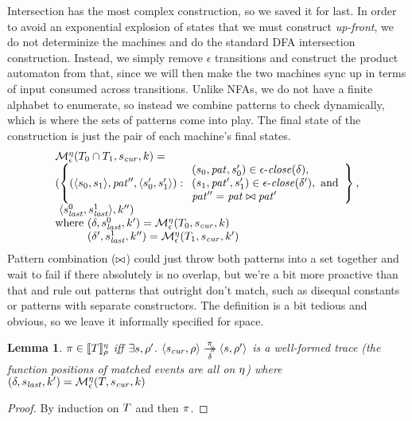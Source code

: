 \documentclass[preprint,onecolumn,9pt]{sigplanconf} %
\newtheorem{lemma}{Lemma}
\begin{document}
Intersection has the most complex construction, so we saved it for last.
%
In order to avoid an exponential explosion of states that we must construct \emph{up-front}, we do not determinize the machines and do the standard DFA intersection construction.
%
Instead, we simply remove $\epsilon$ transitions and construct the product automaton from that, since we will then make the two machines sync up in terms of input consumed across transitions.
%
Unlike NFAs, we do not have a finite alphabet to enumerate, so instead we combine patterns to check dynamically, which is where the sets of patterns come into play.
%
The final state of the construction is just the pair of each machine's final states.
\begin{align*}
  \begin{array}{l}
  \epshelp^\mtimeline(\stAnd{\mtcon_0}{\mtcon_1}, \pmsmqcur, k) = \\
  (\left\{(\pmsmpair{\pmsmqq_0}{\pmsmqq_1}, \mpat'', \pmsmpair{\pmsmqq'_0}{\pmsmqq'_1}) :
          \begin{array}{l}
                (\pmsmqq_0, \mpat, \pmsmqq'_0) \in \epsclose(\delta),\\
                (\pmsmqq_1, \mpat', \pmsmqq'_1) \in \epsclose(\delta'), \text{ and}\\
                \mpat'' = \combinepat{\mpat}{\mpat'}
           \end{array} \right\},\\
  \ \pmsmpair{\pmsmqlast^0}{\pmsmqlast^1}, k'') \\
  \text{where } (\delta, \pmsmqlast^0, k') = \epshelp^\mtimeline(\mtcon_0, \pmsmqcur, k) \\
  \phantom{\text{where }} (\delta', \pmsmqlast^1, k'') = \epshelp^\mtimeline(\mtcon_1, \pmsmqcur, k')
\end{array}
\end{align*}
%
Pattern combination ($\bowtie$) could just throw both patterns into a set together and wait to fail if there absolutely is no overlap, but we're a bit more proactive than that and rule out patterns that outright don't match, such as disequal constants or patterns with separate constructors.
%
The definition is a bit tedious and obvious, so we leave it informally specified for space.

\begin{lemma}
  $\pi \in [\![ T ]\!]^{\eta}_{\rho}$ iff $\exists s, \rho'$. $\langle s_\mathit{cur}, \rho \rangle \overset{\pi}{\underset{\delta}{\to\!\!\!\!\!\to}} \langle s, \rho' \rangle$ is a well-formed trace (the function positions of matched events are all on $\eta$) where $(\delta, s_\mathit{last}, k') = {\mathcal M}_\epsilon^\eta(T, s_\mathit{cur}, k)$
\end{lemma}
\begin{proof}
  By induction on $T$ and then $\pi$.
\end{proof}
\end{document}
